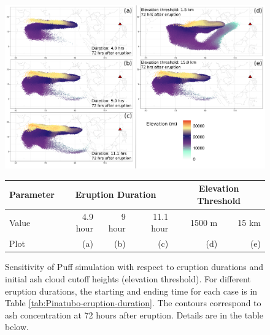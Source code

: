 \documentclass[utf8]{frontiersSCNS} %
\begin{document}
\begin{figure}[!htb]
\centering
\includegraphics[width=0.99 \textwidth]{Figures/duration_cutoff}
\caption{Sensitivity of Puff simulation with respect to eruption durations and initial ash cloud cutoff heights (elevation threshold). For different eruption durations, the starting and ending time for each case is in Table \ref{tab:Pinatubo-eruption-duration}. The contours correspond to ash concentration at 72 hours after eruption. Details are in the table below.}
	 \begin{tabular}{l|rrr|rr}
	 \hline
            Parameter& \multicolumn{3}{c|}{Eruption Duration}& \multicolumn{2}{c}{Elevation Threshold}\\
	 \cline{2-4}
	 \hline 
	 Value &4.9 hour & 9 hour & 11.1 hour &1500 m &15 km \\
	 Plot& (a) & (b) & (c) &  (d) & (e) \\
	 \hline
	 \end{tabular}
\label{fig:Puff-sensitivity-duration-cutoff} 
\end{figure}
\end{document}
